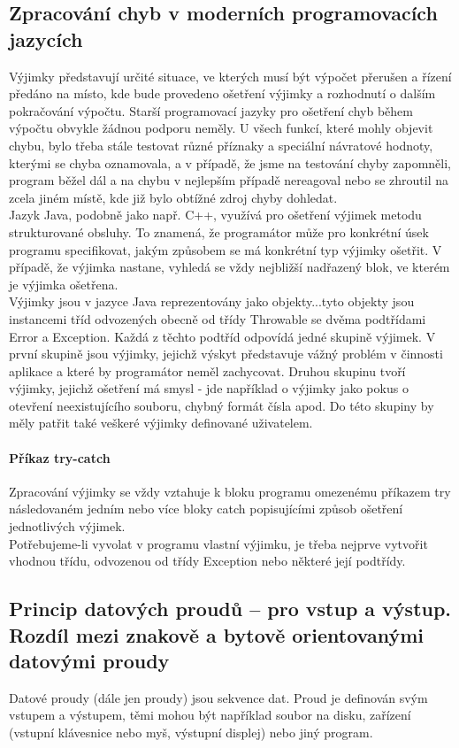 \documentclass[10pt,a4paper]{article}
\begin{document}
\subsection{Zpracování chyb v moderních programovacích jazycích}
Výjimky představují určité situace, ve kterých musí být výpočet přerušen a řízení předáno na místo, kde bude provedeno ošetření výjimky a rozhodnutí o dalším pokračování výpočtu. Starší programovací jazyky pro ošetření chyb během výpočtu obvykle žádnou podporu neměly. U všech funkcí, které mohly objevit chybu, bylo třeba stále testovat různé příznaky a speciální návratové hodnoty, kterými se chyba oznamovala, a v případě, že jsme na testování chyby zapomněli, program běžel dál a na chybu v nejlepším případě nereagoval nebo se zhroutil na zcela jiném místě, kde již bylo obtížné zdroj chyby dohledat. \\
Jazyk Java, podobně jako např. C++, využívá pro ošetření výjimek metodu strukturované obsluhy. To znamená, že programátor může pro konkrétní úsek programu specifikovat, jakým způsobem se má konkrétní typ výjimky ošetřit. V případě, že výjimka nastane, vyhledá se vždy nejbližší nadřazený blok, ve kterém je výjimka ošetřena. \\
Výjimky jsou v jazyce Java reprezentovány jako objekty...tyto objekty jsou instancemi tříd odvozených obecně od třídy Throwable se dvěma podtřídami Error a Exception. Každá z těchto podtříd odpovídá jedné skupině výjimek. V první skupině jsou výjimky, jejichž výskyt představuje vážný problém v činnosti aplikace a které by programátor neměl zachycovat. Druhou skupinu tvoří výjimky, jejichž ošetření má smysl - jde například o výjimky jako pokus o otevření neexistujícího souboru, chybný formát čísla apod. Do této skupiny by měly patřit také veškeré výjimky definované uživatelem.
\paragraph{Příkaz try-catch}
Zpracování výjimky se vždy vztahuje k bloku programu omezenému příkazem try následovaném jedním nebo více bloky catch popisujícími způsob ošetření jednotlivých výjimek. \\
Potřebujeme-li vyvolat v programu vlastní výjimku, je třeba nejprve vytvořit vhodnou třídu, odvozenou od třídy Exception nebo některé její podtřídy.
\subsection{Princip datových proudů – pro vstup a výstup. Rozdíl mezi znakově a bytově orientovanými datovými proudy}
Datové proudy (dále jen proudy) jsou sekvence dat. Proud je definován svým vstupem a výstupem, těmi mohou být například soubor na disku, zařízení (vstupní klávesnice nebo myš, výstupní displej) nebo jiný program.
\end{document}
